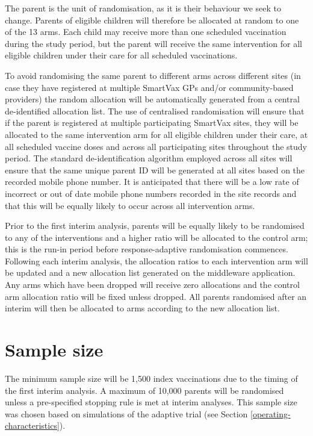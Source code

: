 \documentclass[
  bibliography=totoc]{scrreprt}
\begin{document}
The parent is the unit of randomisation, as it is their behaviour we seek to change.
Parents of eligible children will therefore be allocated at random to one of the 13 arms.
Each child may receive more than one scheduled vaccination during the study period, but the parent will receive the same intervention for all eligible children under their care for all scheduled vaccinations.

To avoid randomising the same parent to different arms across different sites (in case they have registered at multiple SmartVax GPs and/or community-based providers) the random allocation will be automatically generated from a central de-identified allocation list.
The use of centralised randomisation will ensure that if the parent is registered at multiple participating SmartVax sites, they will be allocated to the same intervention arm for all eligible children under their care, at all scheduled vaccine doses and across all participating sites throughout the study period.
The standard de-identification algorithm employed across all sites will ensure that the same unique parent ID will be generated at all sites based on the recorded mobile phone number.
It is anticipated that there will be a low rate of incorrect or out of date mobile phone numbers recorded in the site records and that this will be equally likely to occur across all intervention arms.

Prior to the first interim analysis, parents will be equally likely to be randomised to any of the interventions and a higher ratio will be allocated to the control arm; this is the run-in period before response-adaptive randomisation commences.
Following each interim analysis, the allocation ratios to each intervention arm will be updated and a new allocation list generated on the middleware application.
Any arms which have been dropped will receive zero allocations and the control arm allocation ratio will be fixed unless dropped.
All parents randomised after an interim will then be allocated to arms according to the new allocation list.

\hypertarget{sample-size}{%
\section{Sample size}\label{sample-size}}

The minimum sample size will be 1,500 index vaccinations due to the timing of the first interim analysis.
A maximum of 10,000 parents will be randomised unless a pre-specified stopping rule is met at interim analyses.
This sample size was chosen based on simulations of the adaptive trial (see Section \ref{operating-characteristics}).
\end{document}

